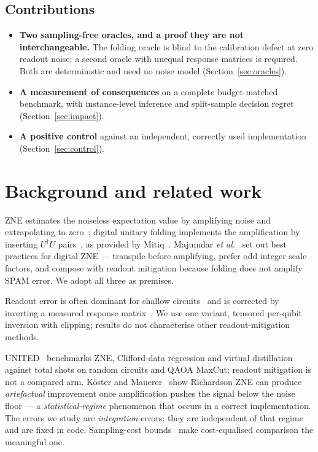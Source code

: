 \documentclass[10pt,conference]{IEEEtran}
\begin{document}
\subsection*{Contributions}
\begin{itemize}
\item \textbf{Two sampling-free oracles, and a proof they are not interchangeable.} The folding
      oracle is blind to the calibration defect at zero readout noise; a second oracle with unequal
      response matrices is required. Both are deterministic and need no noise model
      (Section~\ref{sec:oracles}).
\item \textbf{A measurement of consequences} on a complete budget-matched benchmark, with
      instance-level inference and split-sample decision regret (Section~\ref{sec:impact}).
\item \textbf{A positive control} against an independent, correctly used implementation
      (Section~\ref{sec:control}).
\end{itemize}

\section{Background and related work}\label{sec:related}
ZNE estimates the noiseless expectation value by amplifying noise and extrapolating to
zero~\cite{temme2017,li2017}; digital unitary folding implements the amplification by inserting
$U^{\dagger}U$ pairs~\cite{giurgicatiron2020}, as provided by Mitiq~\cite{larose2022mitiq}. Majumdar
\emph{et al.}~\cite{majumdar2023} set out best practices for digital ZNE --- transpile before
amplifying, prefer odd integer scale factors, and compose with readout mitigation because folding
does not amplify SPAM error. We adopt all three as premises.

Readout error is often dominant for shallow circuits~\cite{bravyi2021} and is corrected by inverting
a measured response matrix~\cite{bravyi2021,nation2021}. We use one variant, tensored per-qubit
inversion with clipping; results do not characterise other readout-mitigation methods.

UNITED~\cite{bultrini2023} benchmarks ZNE, Clifford-data regression and virtual distillation against
total shots on random circuits and QAOA MaxCut; readout mitigation is not a compared arm.
Köster and Mauerer~\cite{koester2026} show Richardson ZNE can produce \emph{artefactual} improvement
once amplification pushes the signal below the noise floor --- a \emph{statistical-regime} phenomenon
that occurs in a correct implementation. The errors we study are \emph{integration} errors; they are
independent of that regime and are fixed in code. Sampling-cost bounds~\cite{takagi2022,quek2024}
make cost-equalised comparison the meaningful one.
\end{document}
